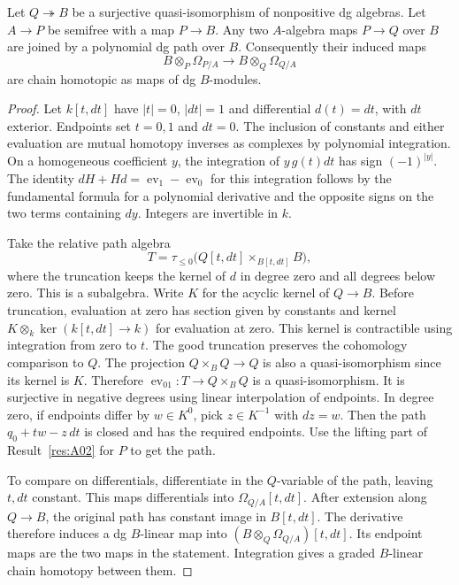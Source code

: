 \begin{lemma}\label{res:A07}
Let \(Q\twoheadrightarrow B\) be a surjective quasi-isomorphism of
nonpositive dg algebras. Let \(A\to P\) be semifree with a map
\(P\to B\).
Any two \(A\)-algebra maps \(P\to Q\) over \(B\) are joined by a
polynomial dg path over \(B\). Consequently their induced maps
\[
 B\otimes_P\Omega_{P/A}\longrightarrow B\otimes_Q\Omega_{Q/A}
\]
are chain homotopic as maps of dg \(B\)-modules.
\end{lemma}
\begin{proof}
Let \(k[t,dt]\) have \(|t|=0\), \(|dt|=1\) and differential
\(d(t)=dt\), with \(dt\) exterior. Endpoints set \(t=0,1\) and
\(dt=0\). The inclusion of constants and either evaluation are
mutual homotopy inverses as complexes by polynomial integration.
On a homogeneous coefficient \(y\), the integration of
\(y\,g(t)dt\) has sign \((-1)^{|y|}\).
The identity \(dH+Hd=\operatorname{ev}_1-\operatorname{ev}_0\)
for this integration follows by the fundamental formula for a
polynomial derivative and the opposite signs on the two terms
containing \(d y\). Integers are invertible in \(k\).

Take the relative path algebra
\[
 T=\tau_{\leq0}\bigl(Q[t,dt]\times_{B[t,dt]} B\bigr),
\]
where the truncation keeps the kernel of \(d\) in degree zero and
all degrees below zero. This is a subalgebra. Write \(K\) for the
acyclic kernel of \(Q\to B\). Before truncation, evaluation at zero
has section given by constants and kernel
\(K\otimes_k\ker(k[t,dt]\to k)\) for evaluation at zero.
This kernel is contractible using integration from zero to \(t\).
The good truncation preserves the cohomology comparison to \(Q\).
The projection \(Q\times_B Q\to Q\) is also a quasi-isomorphism
since its kernel is \(K\). Therefore
\(\operatorname{ev}_{01}:T\to Q\times_B Q\) is a quasi-isomorphism.
It is surjective in negative degrees using linear interpolation
of endpoints. In degree zero, if endpoints differ by \(w\in K^0\),
pick \(z\in K^{-1}\) with \(dz=w\). Then the path
\(q_0+tw-z\,dt\) is closed and has the required endpoints.
Use the lifting part of Result~\ref{res:A02} for \(P\) to get the
path.

To compare on differentials, differentiate in the \(Q\)-variable
of the path, leaving \(t,dt\) constant. This maps differentials
into \(\Omega_{Q/A}[t,dt]\). After extension along \(Q\to B\), the
original path has constant image in \(B[t,dt]\). The derivative
therefore induces a dg \(B\)-linear map into
\((B\otimes_Q\Omega_{Q/A})[t,dt]\). Its endpoint maps are the two
maps in the statement. Integration gives a graded \(B\)-linear
chain homotopy between them.
\end{proof}

